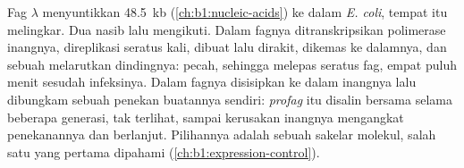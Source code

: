 \begin{proposition}\label{prop:b1:genomes:lambda}
Fag $\lambda$ menyuntikkan \qty{48.5}{kb} 
(\cref{ch:b1:nucleic-acids}) ke dalam \emph{E. coli}, tempat  itu
melingkar. Dua nasib lalu mengikuti. Dalam \emph{}  fagnya
ditranskripsikan polimerase inangnya,  direplikasi seratus kali,
  dibuat lalu dirakit,  dikemas ke dalamnya, dan
sebuah  melarutkan dindingnya:  pecah, sehingga melepas
seratus fag, empat puluh menit sesudah infeksinya. Dalam \emph{}  fagnya disisipkan ke dalam  inangnya lalu
dibungkam sebuah penekan buatannya sendiri: \emph{profag} itu disalin
bersama  selama beberapa generasi, tak terlihat, sampai
kerusakan  inangnya mengangkat penekanannya dan 
berlanjut. Pilihannya adalah sebuah sakelar molekul, salah satu yang
pertama dipahami (\cref{ch:b1:expression-control}).
\end{proposition}

